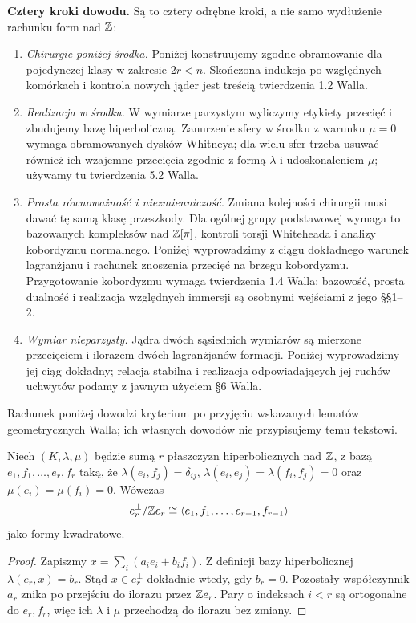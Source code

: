 \noindent\textbf{Cztery kroki dowodu.}
Są to cztery odrębne kroki, a nie samo
wydłużenie rachunku form nad $\mathbb{Z}$:
\begin{enumerate}[label=(\arabic*)]
\item \emph{Chirurgie poniżej środka.}
  Poniżej konstruujemy zgodne obramowanie
  dla pojedynczej klasy w zakresie $2r<n$.
  Skończona indukcja po względnych komórkach
  i kontrola nowych jąder jest treścią
  twierdzenia 1.2 Walla.
\item \emph{Realizacja w środku.}
  W wymiarze parzystym wyliczymy etykiety przecięć i zbudujemy
  bazę hiperboliczną. Zanurzenie sfery w środku
  z warunku $\mu=0$ wymaga obramowanych dysków
  Whitneya; dla wielu sfer trzeba usuwać
  również ich wzajemne przecięcia zgodnie
  z formą $\lambda$ i udoskonaleniem $\mu$;
  używamy tu twierdzenia 5.2 Walla.
\item \emph{Prosta równoważność i niezmienniczość.}
  Zmiana kolejności chirurgii musi dawać
  tę samą klasę przeszkody. Dla ogólnej
  grupy podstawowej wymaga to bazowanych
  kompleksów nad $\mathbb{Z}[\pi]$, kontroli torsji
  Whiteheada i analizy kobordyzmu normalnego.
  Poniżej wyprowadzimy z ciągu dokładnego
  warunek lagranżjanu i rachunek znoszenia
  przecięć na brzegu kobordyzmu. Przygotowanie
  kobordyzmu wymaga twierdzenia 1.4 Walla;
  bazowość, prosta dualność i realizacja
  względnych immersji są osobnymi wejściami
  z jego §§1--2.
\item \emph{Wymiar nieparzysty.}
  Jądra dwóch sąsiednich wymiarów są mierzone
  przecięciem i ilorazem dwóch lagranżjanów
  formacji. Poniżej wyprowadzimy jej ciąg
  dokładny; relacja stabilna i realizacja
  odpowiadających jej ruchów uchwytów
  podamy z jawnym użyciem §6 Walla.
\end{enumerate}
Rachunek poniżej dowodzi kryterium po przyjęciu
wskazanych lematów geometrycznych Walla;
ich własnych dowodów nie przypisujemy temu tekstowi.

\begin{lemat}
\label{lem:para-Wall-22}
Niech $(K,\lambda,\mu)$ będzie sumą $r$ płaszczyzn
hiperbolicznych nad $\mathbb{Z}$, z bazą
$e_1,f_1,\ldots,e_r,f_r$ taką, że
$\lambda(e_i,f_j)=\delta_{ij}$,
$\lambda(e_i,e_j)=\lambda(f_i,f_j)=0$
oraz $\mu(e_i)=\mu(f_i)=0$.
Wówczas
\[
 e_r^\perp/\mathbb{Z} e_r
 \cong\langle e_1,f_1,\ldots,e_{r-1},f_{r-1}\rangle
\]
jako formy kwadratowe.
\end{lemat}
\begin{proof}
Zapiszmy
$x=\sum_i(a_i e_i+b_i f_i)$.
Z definicji bazy hiperbolicznej
$\lambda(e_r,x)=b_r$. Stąd $x\in e_r^\perp$
dokładnie wtedy, gdy $b_r=0$.
Pozostały współczynnik $a_r$ znika po
przejściu do ilorazu przez $\mathbb{Z} e_r$.
Pary o indeksach $i<r$ są ortogonalne
do $e_r,f_r$, więc ich $\lambda$ i $\mu$
przechodzą do ilorazu bez zmiany.
\end{proof}

